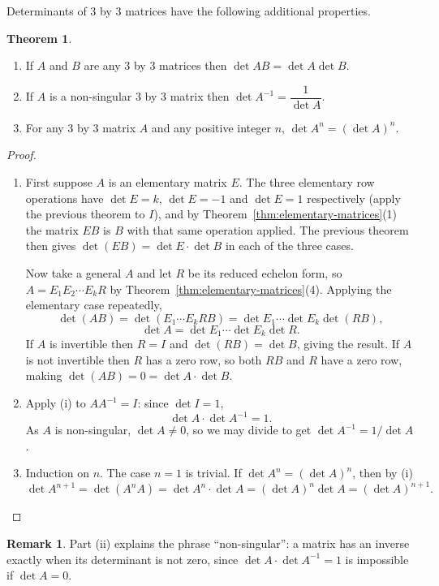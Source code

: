 \documentclass[11pt,a4paper]{article}
\theoremstyle{definition}
\newtheorem{thm}{Theorem}[subsection]
\newtheorem*{remark}{Remark}
\begin{document}
Determinants of 3 by 3 matrices have the following additional properties.


\begin{thm}\label{thm:det-product}
\begin{enumerate}
\item[i.] If $A$ and $B$ are any 3 by 3 matrices then $\det AB=\det A\det B$.
\item[ii.] If $A$ is a non-singular 3 by 3 matrix then $\det A^{-1}=\dfrac{1}{\det A}$.
\item[iii.] For any 3 by 3 matrix $A$ and any positive integer $n$, $\det A^n=(\det A)^n$.
\end{enumerate}
\end{thm}

\begin{proof}
\begin{enumerate}
\item[i.] First suppose $A$ is an elementary matrix $E$. The three elementary
row operations have $\det E=k$, $\det E=-1$ and $\det E=1$ respectively
(apply the previous theorem to $I$), and by
Theorem~\ref{thm:elementary-matrices}(1) the matrix $EB$ is $B$ with that same
operation applied. The previous theorem then gives $\det(EB)=\det E\cdot\det B$
in each of the three cases.

Now take a general $A$ and let $R$ be its reduced echelon form, so
$A=E_1E_2\cdots E_k R$ by Theorem~\ref{thm:elementary-matrices}(4). Applying
the elementary case repeatedly,
$$\det(AB)=\det(E_1\cdots E_kRB)=\det E_1\cdots\det E_k\det(RB),$$
$$\det A=\det E_1\cdots \det E_k \det R.$$
If $A$ is invertible then $R=I$ and $\det(RB)=\det B$, giving the result. If
$A$ is not invertible then $R$ has a zero row, so both $R B$ and $R$ have a
zero row, making $\det(AB)=0=\det A\cdot\det B$.

\item[ii.] Apply (i) to $AA^{-1}=I$: since $\det I=1$,
$$\det A\cdot\det A^{-1}=1.$$
As $A$ is non-singular, $\det A\neq 0$, so we may divide to get
$\det A^{-1}=1/\det A$.

\item[iii.] Induction on $n$. The case $n=1$ is trivial. If
$\det A^{n}=(\det A)^{n}$, then by (i)
$$\det A^{n+1}=\det(A^{n}A)=\det A^{n}\cdot\det A=(\det A)^{n}\det A
=(\det A)^{n+1}.$$
\end{enumerate}
\end{proof}

\begin{remark}
Part (ii) explains the phrase ``non-singular'': a matrix has an inverse exactly
when its determinant is not zero, since $\det A\cdot\det A^{-1}=1$ is
impossible if $\det A=0$.
\end{remark}
\end{document}
